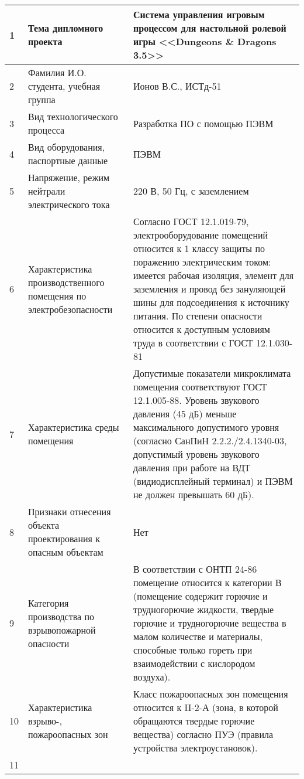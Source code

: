 \begin{longtable}[h]{|p{}|p{}|p{}|}
    1                                                      &
    Тема дипломного проекта                                &
    Система управления игровым процессом для настольной ролевой игры <<Dungeons \& Dragons 3.5>>
  \\ \hline
    2                                     &
    Фамилия И.О. студента, учебная группа &
    Ионов В.С., ИСТд-51
  \\ \hline
    3                             &
    Вид технологического процесса &
    Разработка ПО с помощью ПЭВМ
  \\ \hline
    4                                   &
    Вид оборудования, паспортные данные &
    ПЭВМ
  \\ \hline
    5                                              &
    Напряжение, режим нейтрали электрического тока &
    220 В, 50 Гц, с заземлением
  \\ \hline
    6 &
    Характеристика производственного помещения по электробезопасности &
    Согласно ГОСТ 12.1.019-79, электрооборудование помещений относится к 1 классу защиты по поражению электрическим током: имеется рабочая изоляция, элемент для заземления и провод без зануляющей шины для подсоединения к источнику питания.
    По степени опасности относится к доступным условиям труда в соответствии с ГОСТ 12.1.030-81
  \\ \hline
    7 &
    Характеристика среды помещения &
    Допустимые показатели микроклимата помещения соответствуют ГОСТ 12.1.005-88.
    Уровень звукового давления (45 дБ) меньше максимального допустимого уровня (согласно СанПиН 2.2.2./2.4.1340-03, допустимый уровень звукового давления при работе на ВДТ (видиодисплейный терминал) и ПЭВМ не должен превышать 60 дБ).
  \\ \hline
    8 &
    Признаки отнесения объекта проектирования к опасным объектам &
    Нет
  \\ \hline
    9 &
    Категория производства по взрывопожарной опасности &
    В соответствии с ОНТП 24-86 помещение относится к категории В (помещение содержит горючие и трудногорючие жидкости, твердые горючие и трудногорючие вещества в малом количестве и материалы, способные только гореть при взаимодействии с кислородом  воздуха).
  \\ \hline
    10 &
    Характеристика взрыво-, пожароопасных зон &
    Класс пожароопасных зон помещения относится к II-2-А (зона, в которой обращаются твердые горючие вещества) согласно ПУЭ (правила устройства электроустановок).
  \\ \hline
    11 &

\end{longtable}
